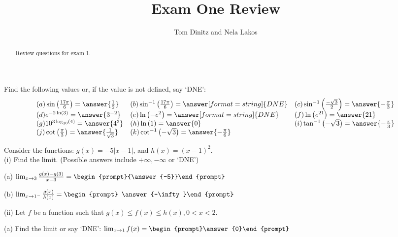 \documentclass{ximera}
\author{Tom Dinitz and Nela Lakos}
\title{Exam One Review}
\begin{document}
\begin{abstract}
Review questions for exam 1.
\end{abstract}
\maketitle

\begin{exercise}
Find the following values or, if the value is not defined, say `DNE':
\[
\begin{array}{l l l}
(a) \sin\left(\frac{17\pi}{6}\right)=\answer{\frac{1}{2}} & (b) \sin^{-1}\left(\frac{17\pi}{6}\right)=\answer[format=string]{DNE} & (c) \sin^{-1}\left(\frac{-\sqrt{3}}{2}\right)=\answer{-\frac{\pi}{3}} \\
(d) e^{-2\ln(3)}=\answer{3^{-2}} & (e) \ln\left(-e^2\right)=\answer[format=string]{DNE} & (f) \ln\left(e^{21}\right)=\answer{21} \\
(g) 10^{3\log_{10}(4)}=\answer{4^3} & (h) \ln\left(1\right)=\answer{0} & (i) \tan^{-1}\left(-\sqrt{3}\right) =\answer{-\frac{\pi}{3}} \\
(j) \cot\left(\frac{\pi}{3}\right)=\answer{\frac{1}{\sqrt{3}}} & (k) \cot^{-1}\left(-\sqrt{3}\right)=\answer{-\frac{\pi}{6}} & 
\end{array}
\]
\end{exercise}

\begin{exercise}
Consider the functions: $g(x)=-5|x-1|$, and $h(x)=(x-1)^2$.\\

(i) Find the limit. (Possible answers include $+\infty, -\infty$ or `DNE')

(a) $\lim_{x\to 3} \frac{g(x)-g(3)}{x-3}=\begin{prompt}{\answer{-5}}\end{prompt}$

(b) $\lim_{x\to 1^-} \frac{g(x)}{h(x)}=\begin{prompt} \answer{-\infty}\end{prompt}$

(ii) Let $f$ be a function such that $g(x)\leq f(x)\leq h(x), 0<x<2$.

(a) Find the limit or say `DNE': $\lim_{x\to 1} f(x)= \begin{prompt}\answer{0}\end{prompt}$
\end{exercise}
\end{document}
